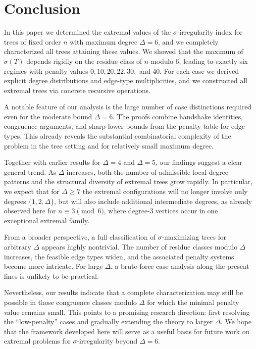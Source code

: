\documentclass[preprint,12pt]{elsarticle}
\begin{document}
\section{Conclusion}



In this paper we determined the extremal values of the $\sigma$-irregularity index 
for trees of fixed order $n$ with maximum degree $\Delta=6$, and we completely 
characterized all trees attaining these values. 
We showed that the maximum of $\sigma(T)$ depends rigidly on the residue class of 
$n$ modulo $6$, leading to exactly six regimes with penalty values 
$0,10,20,22,30,$ and $40$. 
For each case we derived explicit degree distributions and edge-type multiplicities, 
and we constructed all extremal trees via concrete recursive operations.

A notable feature of our analysis is the large number of case distinctions 
required even for the moderate bound $\Delta=6$. 
The proofs combine handshake identities, congruence arguments, and sharp lower 
bounds from the penalty table for edge types. 
This already reveals the substantial combinatorial complexity of the problem 
in the tree setting and for relatively small maximum degree.


Together with earlier results for $\Delta=4$ and $\Delta=5$, our findings suggest 
a clear general trend. 
As $\Delta$ increases, both the number of admissible local degree patterns and the 
structural diversity of extremal trees grow rapidly. 
In particular, we expect that for $\Delta \ge 7$ the extremal configurations will 
no longer involve only degrees $\{1,2,\Delta\}$, but will also include additional 
intermediate degrees, as already observed here for $n \equiv 3 \pmod 6$, where 
degree-$3$ vertices occur in one exceptional extremal family.

From a broader perspective, a full classification of $\sigma$-maximizing trees for 
arbitrary $\Delta$ appears highly nontrivial. 
The number of residue classes modulo $\Delta$ increases, the feasible edge types 
widen, and the associated penalty systems become more intricate. 
For large $\Delta$, a brute-force case analysis along the present lines is unlikely 
to be practical.

Nevertheless, our results indicate that a complete characterization may still be 
possible in those congruence classes modulo $\Delta$ for which the minimal penalty 
value remains small. 
This points to a promising research direction: first resolving the 
``low-penalty'' cases and gradually extending the theory to larger $\Delta$. 
We hope that the framework developed here will serve as a useful basis for future 
work on extremal problems for $\sigma$-irregularity beyond $\Delta=6$.
\end{document}
